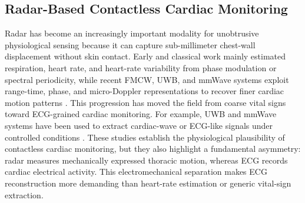 \documentclass[lettersize,journal]{IEEEtran}
\begin{document}
\subsection{Radar-Based Contactless Cardiac Monitoring}
Radar has become an increasingly important modality for unobtrusive physiological sensing because it can capture sub-millimeter chest-wall displacement without skin contact. Early and classical work mainly estimated respiration, heart rate, and heart-rate variability from phase modulation or spectral periodicity, while recent FMCW, UWB, and mmWave systems exploit range-time, phase, and micro-Doppler representations to recover finer cardiac motion patterns \cite{zhang2023overview,wuNonintrusiveHumanVital2024,kouhalvandi2025advances,noceraMachineLearningRADARbased2024}. This progression has moved the field from coarse vital signs toward ECG-grained cardiac monitoring. For example, UWB and mmWave systems have been used to extract cardiac-wave or ECG-like signals under controlled conditions \cite{wangECGgrainedCardiacMonitoring2022c,xuCardiacWaveMmWavebasedScheme2021,chenmmwave}. These studies establish the physiological plausibility of contactless cardiac monitoring, but they also highlight a fundamental asymmetry: radar measures mechanically expressed thoracic motion, whereas ECG records cardiac electrical activity. This electromechanical separation makes ECG reconstruction more demanding than heart-rate estimation or generic vital-sign extraction.
\end{document}
